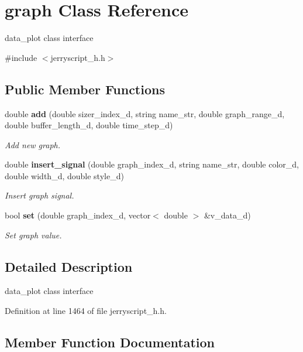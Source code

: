 \section{graph Class Reference}
\label{classgraph}


data\+\_\+plot class interface  




{\ttfamily \#include $<$jerryscript\+\_\+h.\+h$>$}

\subsection*{Public Member Functions}
\begin{DoxyCompactItemize}
\item 
double \textbf{ add} (double sizer\+\_\+index\+\_\+d, string name\+\_\+str, double graph\+\_\+range\+\_\+d, double buffer\+\_\+length\+\_\+d, double time\+\_\+step\+\_\+d)
\begin{DoxyCompactList}\small\item\em Add new graph. \end{DoxyCompactList}\item 
double \textbf{ insert\+\_\+signal} (double graph\+\_\+index\+\_\+d, string name\+\_\+str, double color\+\_\+d, double width\+\_\+d, double style\+\_\+d)
\begin{DoxyCompactList}\small\item\em Insert graph signal. \end{DoxyCompactList}\item 
bool \textbf{ set} (double graph\+\_\+index\+\_\+d, vector$<$ double $>$ \&v\+\_\+data\+\_\+d)
\begin{DoxyCompactList}\small\item\em Set graph value. \end{DoxyCompactList}\end{DoxyCompactItemize}


\subsection{Detailed Description}
data\+\_\+plot class interface 

Definition at line 1464 of file jerryscript\+\_\+h.\+h.



\subsection{Member Function Documentation}
\mbox{\label{classgraph_a50d78ce95b49dcfbfe3543a1d66480a5}} 
